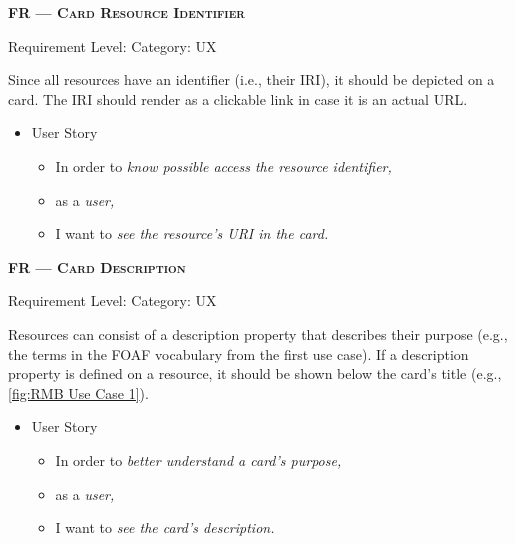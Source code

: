 \centerline{\textbf{FR\textsubscript{} --- \textsc{Card Resource Identifier}}}
\centerline{\small Requirement Level:  \quad{} Category: \acrshort*{UX}}

\noindent Since all resources have an identifier (i.e., their \acrshort*{IRI}), it should be depicted on a card. The \acrshort*{IRI} should render as a clickable link in case it is an actual \acrshort*{URL}.


\begin{itemize}[after=\vspace{1em}]
    \setlength\itemsep{-0.5em}
	\item[] User Story\\[-7.8mm]
	\begin{itemize}
    \setlength\itemsep{-0.5em}
        \item[] In order to \textit{know  possible access the resource identifier,}
        \item[] as a \textit{user,}
        \item[] I want to \textit{see the resource’s \acrshort*{URI} in the card.}
    \end{itemize}
\end{itemize}





\centerline{\textbf{FR\textsubscript{} --- \textsc{Card Description}}}
\centerline{\small Requirement Level:  \quad{} Category: \acrshort*{UX}}

\noindent Resources can consist of a description property that describes their purpose (e.g., the terms in the \acrshort*{FOAF} vocabulary from the first use case). If a description property is defined on a resource, it should be shown below the card’s title (e.g., \autoref{fig:RMB Use Case 1}).

\begin{itemize}[after=\vspace{1em}]
    \setlength\itemsep{-0.5em}
	\item[] User Story\\[-7.8mm]
	\begin{itemize}
    \setlength\itemsep{-0.5em}
        \item[] In order to \textit{better understand a card’s purpose,}
        \item[] as a \textit{user,}
        \item[] I want to \textit{see the card’s description.}
    \end{itemize}
\end{itemize}




